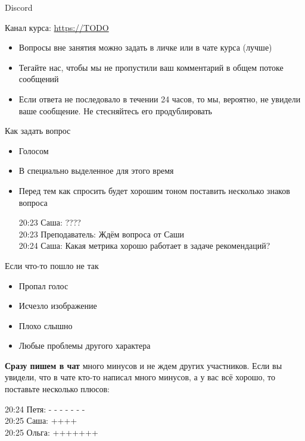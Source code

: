 \documentclass[11pt,aspectratio=169,handout]{beamer}
\begin{document}
\begin{frame}{Discord}

Канал курса: \url{https://TODO}

\vfill

\begin{itemize}
\item Вопросы вне занятия можно задать в личке или в чате курса (лучше)
\item Тегайте нас, чтобы мы не пропустили ваш комментарий в общем потоке сообщений
\item Если ответа не последовало в течении 24 часов, то мы, вероятно, не увидели ваше сообщение. Не стесняйтесь его продублировать
\end{itemize}

\end{frame}

\begin{frame}{Как задать вопрос}

\begin{itemize}
\item Голосом
\item В специально выделенное для этого время
\item Перед тем как спросить будет хорошим тоном поставить несколько знаков вопроса
\begin{tcolorbox}[colback=gray!5,colframe=gray!80,title=]
20:23 Саша: ???? \\
20:23 Преподаватель: Ждём вопроса от Саши \\
20:24 Саша: Какая метрика хорошо работает в задаче рекомендаций?
\end{tcolorbox}
\end{itemize}

\end{frame}

\begin{frame}{Если что-то пошло не так}

\begin{itemize}
\item Пропал голос
\item Исчезло изображение
\item Плохо слышно
\item Любые проблемы другого характера
\end{itemize}
\vfill
{\bf Сразу пишем в чат} много минусов и не ждем других участников. Если вы увидели, что в чате кто-то написал много минусов, а у вас всё хорошо, то поставьте несколько плюсов:
\vfill
\begin{tcolorbox}[colback=gray!5,colframe=gray!80,title=]
20:24 Петя: - - - - - - -  \\
20:25 Саша: ++++ \\
20:25 Ольга: +++++++
\end{tcolorbox}

\end{frame}
\end{document}
